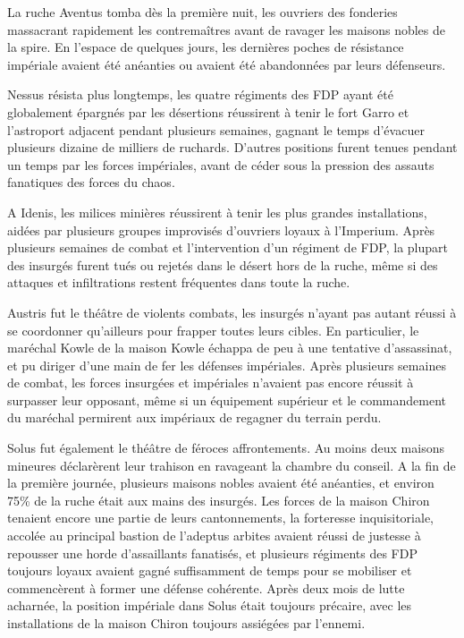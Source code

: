 \documentclass[10pt,a4paper]{book}
\begin{document}
La ruche Aventus tomba dès la première nuit, les ouvriers des fonderies massacrant rapidement les contremaîtres avant de ravager les maisons nobles de la spire. En l'espace de quelques jours, les dernières poches de résistance impériale avaient été anéanties ou avaient été abandonnées par leurs défenseurs.

Nessus résista plus longtemps, les quatre régiments des FDP ayant été globalement épargnés par les désertions réussirent à tenir le fort Garro et l'astroport adjacent pendant plusieurs semaines, gagnant le temps d'évacuer plusieurs dizaine de milliers de ruchards. D'autres positions furent tenues pendant un temps par les forces impériales, avant de céder sous la pression des assauts fanatiques des forces du chaos.

A Idenis, les milices minières réussirent à tenir les plus grandes installations, aidées par plusieurs groupes improvisés d'ouvriers loyaux à l'Imperium. Après plusieurs semaines de combat et l'intervention d'un régiment de FDP, la plupart des insurgés furent tués ou rejetés dans le désert hors de la ruche, même si des attaques et infiltrations restent fréquentes dans toute la ruche.

Austris fut le théâtre de violents combats, les insurgés n'ayant pas autant réussi à se coordonner qu'ailleurs pour frapper toutes leurs cibles. En particulier, le maréchal Kowle de la maison Kowle échappa de peu à une tentative d'assassinat, et pu diriger d'une main de fer les défenses impériales. Après plusieurs semaines de combat, les forces insurgées et impériales n'avaient pas encore réussit à surpasser leur opposant, même si un équipement supérieur et le commandement du maréchal permirent aux impériaux de regagner du terrain perdu.

Solus fut également le théâtre de féroces affrontements. Au moins deux maisons mineures déclarèrent leur trahison en ravageant la chambre du conseil. A la fin de la première journée, plusieurs maisons nobles avaient été anéanties, et environ 75\% de la ruche était aux mains des insurgés. Les forces de la maison Chiron tenaient encore une partie de leurs cantonnements, la forteresse inquisitoriale, accolée au principal bastion de l'adeptus arbites avaient réussi de justesse à repousser une horde d'assaillants fanatisés, et plusieurs régiments des FDP toujours loyaux avaient gagné suffisamment de temps pour se mobiliser et commencèrent à former une défense cohérente. Après deux mois de lutte acharnée, la position impériale dans Solus était toujours précaire, avec les installations de la maison Chiron toujours assiégées par l'ennemi.
\end{document}
